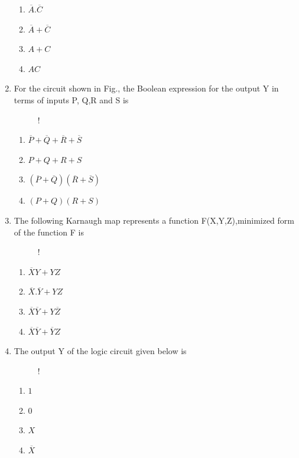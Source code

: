 \documentclass[journal,12pt,twocolumn]{IEEEtran}
\begin{document}
\begin{enumerate}
   \begin{enumerate}
      \item $\overline{A}.\overline{C}$
      \item $\overline{A}+\overline{C}$
      \item $A+C$
      \item $AC$
    \end{enumerate}
    \item For the circuit shown in Fig., the Boolean expression for the output Y in terms of inputs P, Q,R and S is
\begin{figure}[!h]
\centering
\resizebox {\columnwidth} {!} {

}
\caption{}
\end{figure}
      \begin{enumerate}
      \item $\overline{P}+\overline{Q}+\overline{R}+\overline{S}$
      \item $P+Q+R+S$
      \item $(\overline{P}+\overline{Q})(\overline{R}+\overline{S})$
      \item $(P+Q)(R+S)$
    \end{enumerate}
    \item The following Karnaugh map represents a function F(X,Y,Z),minimized form of the function F is
\begin{figure}[!h]
\centering
\resizebox {\columnwidth} {!} {

}
\caption{}
\end{figure}
      \begin{enumerate}                  
      \item $\overline{X}Y+YZ$
      \item $\overline{X}.\overline{Y}+YZ$
      \item $\overline{X}\overline{Y}+Y\overline{Z}$
      \item $\overline{X}\overline{Y}+\overline{Y}Z$
      \end{enumerate}
\item The output Y of the logic circuit given below is
                        \begin{figure}[!h]
\centering
\resizebox {\columnwidth} {!} {

}
\caption{}
\end{figure}
                        \begin{enumerate}
      \item $1$
      \item $0$
      \item $X$
      \item $\overline{X}$
    \end{enumerate}    
   

\end{enumerate}
\end{document}
